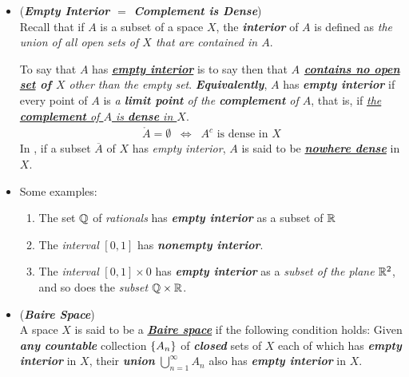 \documentclass[11pt]{article}
\begin{document}
\begin{itemize}
\item \begin{remark} (\emph{\textbf{Empty Interior $=$ Complement is Dense}}) \\
Recall that if $A$ is a subset of a space $X$, the \emph{\textbf{interior}} of $A$ is defined as \emph{the union of all open sets of $X$ that are contained in $A$}. 

To say that $A$ has \underline{\emph{\textbf{empty interior}}} is to say then that \emph{\textbf{$A$ \underline{contains no open set} of $X$} other than the empty set}. \emph{\textbf{Equivalently}}, $A$ has \emph{\textbf{empty interior}} if every point of $A$ is \emph{a \textbf{limit point} of the \textbf{complement} of $A$}, that is, if \underline{\emph{the \textbf{complement} of $A$ is \textbf{dense} in $X$}}.
\begin{align*}
\mathring{A} = \emptyset \;\; \Leftrightarrow \;\; A^{c}\text{ is dense in }X
\end{align*} In \citep{reed1980methods}, if a subset $\overline{A}$ of $X$ has \emph{empty interior}, $A$ is said to be \underline{\emph{\textbf{nowhere dense}}} in $X$.
\end{remark}

\item \begin{example} 
Some  examples:
\begin{enumerate}
\item The set ${\mathbb Q}$ of \emph{rationals} has \emph{\textbf{empty interior}} as a subset of ${\mathbb R}$
\item The \emph{interval} $[0, 1]$ has \emph{\textbf{nonempty interior}}. 
\item The \emph{interval} $[0, 1] \times 0$ has \emph{\textbf{empty interior}} as a \emph{subset of the plane} ${\mathbb R}^2$, and so does the \emph{subset} ${\mathbb Q} \times {\mathbb R}$.
\end{enumerate}
\end{example}

\item \begin{definition} (\emph{\textbf{Baire Space}})\\
A space $X$ is said to be a \underline{\emph{\textbf{Baire space}}} if the following condition holds:  Given  \emph{\textbf{any countable}} collection $\left\{A_n\right\}$ of \emph{\textbf{closed}} sets of $X$ each of which has \emph{\textbf{empty interior}} in $X$, their \emph{\textbf{union}}  $\bigcup_{n=1}^{\infty} A_n$ also has \emph{\textbf{empty interior}} in $X$.
\end{definition}


\end{itemize}
\end{document}
